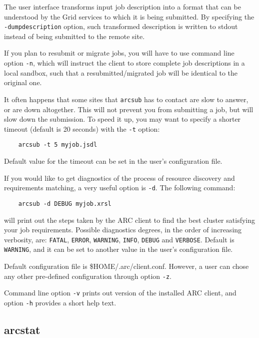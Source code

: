 The user interface transforms input job description into a format
that can be understood by the Grid services to which it is being
submitted. By specifying the \verb#-dumpdescription# option, such transformed
description is written to stdout instead of being submitted to the remote site.



If you plan to resubmit or migrate jobs, you will have to use command line
option \verb#-n#, which will instruct the client to store complete job descriptions
in a local sandbox, such that a resubmitted/migrated job will be identical to the
original one.

It often happens that some sites that \verb#arcsub# has to contact
are slow to answer, or are down altogether. This will not prevent
you from submitting a job, but will slow down the submission. To
speed it up, you may want to specify a shorter timeout (default is
20 seconds) with the \verb#-t# option:
\begin{verbatim}
    arcsub -t 5 myjob.jsdl
\end{verbatim}

Default value for the timeout can be set in the user's configuration file.

If you would like to get diagnostics of the process of resource
discovery and requirements matching, a very useful option is
\verb#-d#. The following command:
\begin{verbatim}
    arcsub -d DEBUG myjob.xrsl
\end{verbatim}

will print out the steps taken by the ARC client to find the
best cluster satisfying your job requirements. Possible diagnostics degrees, in the
order of increasing verbosity, are: \texttt{FATAL}, \texttt{ERROR}, \texttt{WARNING},
\texttt{INFO}, \texttt{DEBUG} and \texttt{VERBOSE}. Default is \texttt{WARNING}, and
it can be set to another value in the user's configuration file.

Default configuration file is {\$}HOME/.arc/client.conf. However, a user can chose any
other pre-defined configuration through option \verb#-z#.

Command line option \verb#-v# prints out version of the installed ARC client, and option
\verb#-h# provides a short help text.


\subsection{arcstat}
\label{sec:arcstat}

